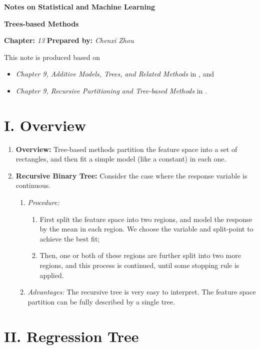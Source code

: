 \documentclass[12pt]{article}
\newcommand{\titlebox}[4]{
\begin{tcolorbox}[colback = blue!5!white!95, colframe = blue!70!black
]
  \noindent \textbf{ #1 } \hfill \textit{#2} 
  \begin{center}
  	 \LARGE{\textbf{#3}}
  \end{center}
\textbf{Chapter:} \textit{#4} \hfill \textbf{Prepared by:} \textit{Chenxi Zhou}
\end{tcolorbox}
}
\begin{document}
\titlebox{Notes on Statistical and Machine Learning}{}{Trees-based Methods}{13}
\thispagestyle{plain}

\vspace{10pt}

This note is produced based on 
\begin{itemize}
	\item \textit{Chapter 9, Additive Models, Trees, and Related Methods} in \textcite{Friedman2001-np}, and 
	\item \textit{Chapter 9, Recursive Partitioning and Tree-based Methods} in \textcite{Izenman2009-jk}. 
\end{itemize}

\section*{I. Overview}

\begin{enumerate}[label=\textbf{\arabic*.}]

	\item \textbf{Overview:} Tree-based methods partition the feature space into a set of rectangles, and then fit a simple model (like a constant) in each one. 
	
	\item \textbf{Recursive Binary Tree:} Consider the case where the response variable is continuous. 
	\begin{enumerate}
		\item \textit{Procedure:} 
		\begin{enumerate} 
			\item First split the feature space into two regions, and model the response by the mean in each region. We choose the variable and split-point to achieve the best fit; 
			\item Then, one or both of these regions are further split into two more regions, and this process is continued, until some stopping rule is applied. 
		\end{enumerate}
		\item \textit{Advantages:} The recursive tree is very easy to interpret. The feature space partition can be fully described by a single tree. 
	\end{enumerate}
	
\end{enumerate}


\section*{II. Regression Tree} 
\end{document}
